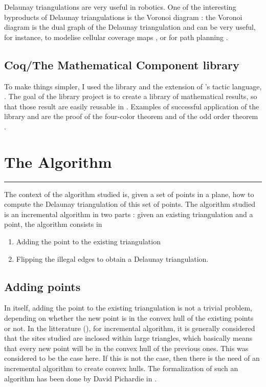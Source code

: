 \documentclass[a4paper,10pt]{article}
\begin{document}
Delaunay triangulations are very useful in robotics. One of the interesting byproducts of Delaunay triangulations is the Voronoi diagram : the Voronoi diagram is the dual graph of the Delaunay triangulation and can be very useful, for instance, to modelise cellular coverage maps \cite{CelCov}, or for path planning \cite{PathPla}.

\subsection{Coq/The Mathematical Component library}

To make things simpler, I used the {} library and the extension of {}'s tactic language, {}. The goal of the {} library project is to create a library of mathematical results, so that those result are easily reusable in {}. Examples of successful application of the {} library and {} are the proof of the four-color theorem \cite{Gonthier08} and of the odd order theorem \cite{odd}.

\section{The Algorithm}
\label{algo}
\rule{\linewidth}{0.5pt}

The context of the algorithm studied is, given a set of points in a plane, how to compute the Delaunay triangulation of this set of points. The algorithm studied is an incremental algorithm in two parts : given an existing triangulation and a point, the algorithm consists in
\begin{enumerate}
\item Adding the point to the existing triangulation
\item Flipping the illegal edges to obtain a Delaunay triangulation.
\end{enumerate}

\subsection{Adding points}

In itself, adding the point to the existing triangulation is not a trivial problem, depending on whether the new point is in the convex hull of the existing points or not. In the litterature (\cite{Del}), for incremental algorithm, it is generally considered that the sites studied are inclosed within large triangles, which basically means that every new point will be in the convex hull of the previous ones. This was considered to be the case here. If this is not the case, then there is the need of an incremental algorithm to create convex hulls. The formalization of such an algorithm has been done by David Pichardie in \cite{Hull}.
\end{document}
